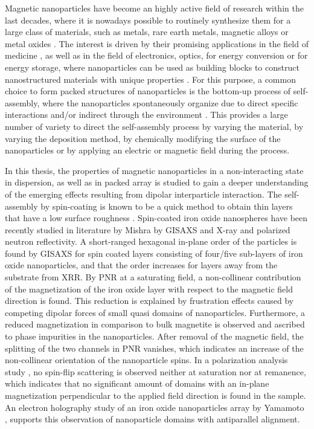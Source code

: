 \documentclass[\main/dresen_thesis.tex]{subfiles}
\begin{document}
  Magnetic nanoparticles have become an highly active field of research within the last decades, where it is nowadays possible to routinely synthesize them for a large class of materials, such as metals, rare earth metals, magnetic alloys or metal oxides \cite{Gubin_2005_Magne}.
  The interest is driven by their promising applications in the field of medicine \cite{Thanh_2012_Magne}, as well as in the field of electronics, optics, for energy conversion or for energy storage, where nanoparticles can be used as building blocks to construct nanostructured materials with unique properties \cite{Singamaneni_2011_Magne}.
  For this purpose, a common choice to form packed structures of nanoparticles is the bottom-up process of self-assembly, where the nanoparticles spontaneously organize due to direct specific interactions and/or indirect through the environment \cite{Grzelczak_2010_direc, Whitesides_2002_Selfa}.
  This provides a large number of variety to direct the self-assembly process \ie by varying the material, by varying the deposition method, by chemically modifying the surface of the nanoparticles or by applying an electric or magnetic field during the process.

  In this thesis, the properties of magnetic nanoparticles in a non-interacting state in dispersion, as well as in packed array is studied to gain a deeper understanding of the emerging effects resulting from dipolar interparticle interaction.
  The self-assembly by spin-coating is known to be a quick method to obtain thin layers that have a low surface roughness \cite{Xu_2012_Trans}.
  Spin-coated iron oxide nanospheres have been recently studied in literature by Mishra \etal \cite{Mishra_2012_Selfa} by GISAXS and X-ray and polarized neutron reflectivity.
  A short-ranged hexagonal in-plane order of the particles is found by GISAXS for spin coated layers consisting of four/five sub-layers of iron oxide nanoparticles, and that the order increases for layers away from the substrate from XRR.
  By PNR at a saturating field, a non-collinear contribution of the magnetization of the iron oxide layer with respect to the magnetic field direction is found.
  This reduction is explained by frustration effects caused by competing dipolar forces of small quasi domains of nanoparticles.
  Furthermore, a reduced magnetization in comparison to bulk magnetite is observed and ascribed to phase impurities in the nanoparticles.
  After removal of the magnetic field, the splitting of the two channels in PNR vanishes, which indicates an increase of the non-collinear orientation of the nanoparticle spins.
  In a polarization analysis study \cite{Mishra_2015_Polar}, no spin-flip scattering is observed neither at saturation nor at remanence, which indicates that no significant amount of domains with an in-plane magnetization perpendicular to the applied field direction is found in the sample.
  An electron holography study of an iron oxide nanoparticles array by Yamamoto \etal \cite{Yamamoto_2011_Dipol}, supports this observation of nanoparticle domains with antiparallel alignment.
  \\
\end{document}
